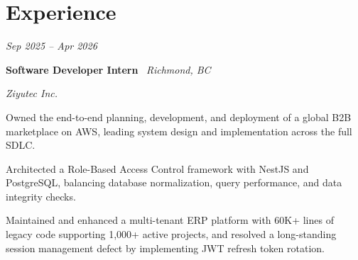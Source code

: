 \section{Experience}

    \begin{twocolentry}{

    \textit{Sep 2025 -- Apr 2026}}
        \textbf{Software Developer Intern} \textbar\ \textit{Richmond, BC}
        
        \textit{Ziyutec Inc.}
    \end{twocolentry}

    \vspace{0.10 cm}
    \begin{onecolentry}
        \begin{highlights}
    
    \item Owned the end-to-end planning, development, and deployment of a global B2B marketplace on AWS, leading system design and implementation across the full SDLC.
    \item Architected a Role-Based Access Control framework with NestJS and PostgreSQL, balancing database normalization, query performance, and data integrity checks.
    \item Maintained and enhanced a multi-tenant ERP platform with 60K+ lines of legacy code supporting 1,000+ active projects, and resolved a long-standing session management defect by implementing JWT refresh token rotation.
        
        \end{highlights}
    \end{onecolentry}
